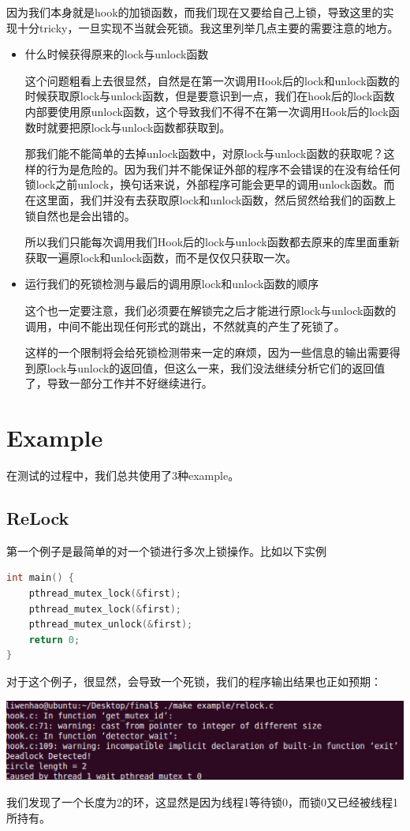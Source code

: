 \documentclass[titlepage]{article}
\begin{document}
\indent 因为我们本身就是hook的加锁函数，而我们现在又要给自己上锁，导致这里的实现十分tricky，一旦实现不当就会死锁。我这里列举几点主要的需要注意的地方。
\begin{itemize}
	\item 什么时候获得原来的lock与unlock函数
	
这个问题粗看上去很显然，自然是在第一次调用Hook后的lock和unlock函数的时候获取原lock与unlock函数，但是要意识到一点，我们在hook后的lock函数内部要使用原unlock函数，这个导致我们不得不在第一次调用Hook后的lock函数时就要把原lock与unlock函数都获取到。

那我们能不能简单的去掉unlock函数中，对原lock与unlock函数的获取呢？这样的行为是危险的。因为我们并不能保证外部的程序不会错误的在没有给任何锁lock之前unlock，换句话来说，外部程序可能会更早的调用unlock函数。而在这里面，我们并没有去获取原lock和unlock函数，然后贸然给我们的函数上锁自然也是会出错的。

所以我们只能每次调用我们Hook后的lock与unlock函数都去原来的库里面重新获取一遍原lock和unlock函数，而不是仅仅只获取一次。

	\item 运行我们的死锁检测与最后的调用原lock和unlock函数的顺序

这个也一定要注意，我们必须要在解锁完之后才能进行原lock与unlock函数的调用，中间不能出现任何形式的跳出，不然就真的产生了死锁了。

这样的一个限制将会给死锁检测带来一定的麻烦，因为一些信息的输出需要得到原lock与unlock的返回值，但这么一来，我们没法继续分析它们的返回值了，导致一部分工作并不好继续进行。
\end{itemize}

\section{Example}
在测试的过程中，我们总共使用了3种example。
\subsection{ReLock}
\indent 第一个例子是最简单的对一个锁进行多次上锁操作。比如以下实例
\begin{lstlisting}[language=C]
int main() {
    pthread_mutex_lock(&first);
    pthread_mutex_lock(&first);
    pthread_mutex_unlock(&first);
    return 0;
}
\end{lstlisting}
\indent 对于这个例子，很显然，会导致一个死锁，我们的程序输出结果也正如预期：
\begin{center}
\footnotesize
\includegraphics[scale=0.4]{example1.png}
\normalsize
\end{center}
\indent 我们发现了一个长度为2的环，这显然是因为线程1等待锁0，而锁0又已经被线程1所持有。
\end{document}
